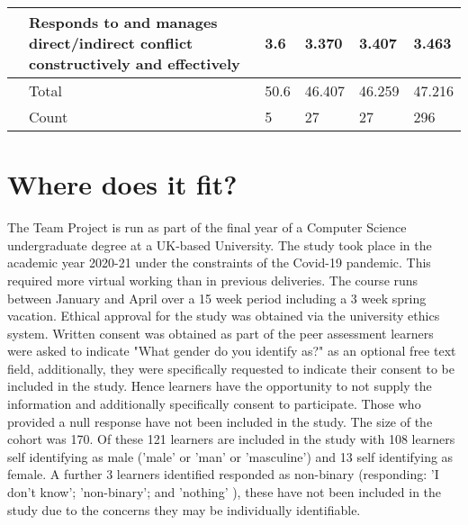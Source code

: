\documentclass[sigconf, anonymous=true]{acmart}
\begin{document}
\begin{table*}[ht]
\begin{tabular} {| p{3cm} | p{8cm} | p{1cm}| p{1cm} | p{1cm}| p{1cm} |}
		\hline
		& Responds to and manages direct/indirect conflict constructively and effectively                  & 3.6                                                     & 3.370                                                 & 3.407                                                 & 3.463                                               \\
		\hline
		& Total                                                                                                              & 50.6                                                    & 46.407                                                & 46.259                                                & 47.216                                              \\
		\hline
		& Count                                                                                                              & 5                                                       & 27                                                    & 27                                                    & 296
		\\
		\hline
	\end{tabular}
	\label{tab:means}
\end{table*}


\section{Where does it fit?}
The Team Project is run as part of the final year of a Computer Science undergraduate degree at a UK-based University. The study took place in the academic year 2020-21 under the constraints of the Covid-19 pandemic. This required more virtual working than in previous deliveries. The course runs between January and April over a 15 week period including a 3 week spring vacation. Ethical approval for the study was obtained via the university ethics system.  Written consent was obtained as part of the peer assessment learners were asked to indicate "What gender do you identify as?" as an optional free text field, additionally, they were specifically requested to indicate their consent to be included in the study. Hence learners have the opportunity to not supply the information and additionally specifically consent to participate. Those who provided a null response have not been included in the study. The size of the cohort was 170. Of these 121 learners are included in the study with 108 learners self identifying as male ('male' or 'man' or 'masculine') and 13 self identifying as female. A further 3 learners identified responded as non-binary (responding: 'I don't know'; 'non-binary'; and 'nothing' ), these have not been included in the study due to the concerns they may be individually identifiable.
\end{document}
